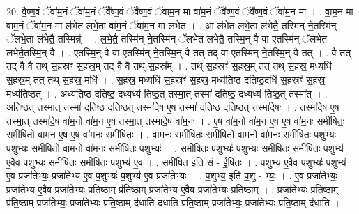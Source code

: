\documentclass[17pt]{extarticle}
\begin{document}
20. वै॒ष्ण॒वं ॅवा॑म॒नं ॅवा॑म॒नं ॅवै᳚ष्ण॒वं ॅवै᳚ष्ण॒वं ॅवा॑म॒न मा वा॑म॒नं ॅवै᳚ष्ण॒वं ॅवै᳚ष्ण॒वं ॅवा॑म॒न मा । . वा॒म॒न मा वा॑म॒नं ॅवा॑म॒न मा ल॑भेत लभे॒ता वा॑म॒नं ॅवा॑म॒न मा ल॑भेत । . आ ल॑भेत लभे॒ता ल॑भेतै॒ तस्मि॑न् ने॒तस्मि॑न् ॅलभे॒ता ल॑भेतै॒ तस्मिन्न्॑ । . ल॒भे॒तै॒ तस्मि॑न् ने॒तस्मि॑न् ॅलभेत लभेतै॒ तस्मि॒न् वै वा ए॒तस्मि॑न् ॅलभेत लभेतै॒तस्मि॒न् वै । . ए॒तस्मि॒न् वै वा ए॒तस्मि॑न् ने॒तस्मि॒न् वै तत् तद् वा ए॒तस्मि॑न् ने॒तस्मि॒न् वै तत् । . वै तत् तद् वै वै तथ् स॒हस्रꣳ॑ स॒हस्र॒म् तद् वै वै तथ् स॒हस्र᳚म् । . तथ् स॒हस्रꣳ॑ स॒हस्र॒म् तत् तथ् स॒हस्र॒ मध्यधि॑ स॒हस्र॒म् तत् तथ् स॒हस्र॒ मधि॑ । . स॒हस्र॒ मध्यधि॑ स॒हस्रꣳ॑ स॒हस्र॒ मध्य॑तिष्ठ दतिष्ठ॒दधि॑ स॒हस्रꣳ॑ स॒हस्र॒ मध्य॑तिष्ठत् । . अध्य॑तिष्ठ दतिष्ठ॒ दध्यध्य॑ तिष्ठ॒त् तस्मा॒त् तस्मा॑ दतिष्ठ॒ दध्यध्य॑ तिष्ठ॒त् तस्मा᳚त् । . अ॒ति॒ष्ठ॒त् तस्मा॒त् तस्मा॑ दतिष्ठ दतिष्ठ॒त् तस्मा॑दे॒ष ए॒ष तस्मा॑ दतिष्ठ दतिष्ठ॒त् तस्मा॑दे॒षः । . तस्मा॑दे॒ष ए॒ष तस्मा॒त् तस्मा॑दे॒ष वा॑म॒नो वा॑म॒न ए॒ष तस्मा॒त् तस्मा॑दे॒ष वा॑म॒नः । . ए॒ष वा॑म॒नो वा॑म॒न ए॒ष ए॒ष वा॑म॒नः समी॑षितः॒ समी॑षितो वाम॒न ए॒ष ए॒ष वा॑म॒नः समी॑षितः । . वा॒म॒नः समी॑षितः॒ समी॑षितो वाम॒नो वा॑म॒नः समी॑षितः प॒शुभ्यः॑ प॒शुभ्यः॒ समी॑षितो वाम॒नो वा॑म॒नः समी॑षितः प॒शुभ्यः॑ । . समी॑षितः प॒शुभ्यः॑ प॒शुभ्यः॒ समी॑षितः॒ समी॑षितः प॒शुभ्य॑ ए॒वैव प॒शुभ्यः॒ समी॑षितः॒ समी॑षितः प॒शुभ्य॑ ए॒व । . समी॑षित॒ इति॒ सं - ई॒षि॒तः॒ । . प॒शुभ्य॑ ए॒वैव प॒शुभ्यः॑ प॒शुभ्य॑ ए॒व प्रजा॑तेभ्यः॒ प्रजा॑तेभ्य ए॒व प॒शुभ्यः॑ प॒शुभ्य॑ ए॒व प्रजा॑तेभ्यः । . प॒शुभ्य॒ इति॑ प॒शु - भ्यः॒ । . ए॒व प्रजा॑तेभ्यः॒ प्रजा॑तेभ्य ए॒वैव प्रजा॑तेभ्यः प्रति॒ष्ठाम् प्र॑ति॒ष्ठाम् प्रजा॑तेभ्य ए॒वैव प्रजा॑तेभ्यः प्रति॒ष्ठाम् । . प्रजा॑तेभ्यः प्रति॒ष्ठाम् प्र॑ति॒ष्ठाम् प्रजा॑तेभ्यः॒ प्रजा॑तेभ्यः प्रति॒ष्ठाम् द॑धाति दधाति प्रति॒ष्ठाम् प्रजा॑तेभ्यः॒ प्रजा॑तेभ्यः प्रति॒ष्ठाम् द॑धाति । \newline
\end{document}
